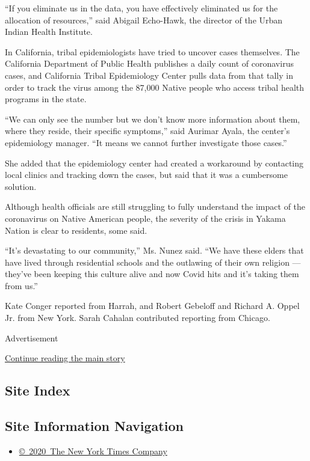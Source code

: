``If you eliminate us in the data, you have effectively eliminated us
for the allocation of resources,'' said Abigail Echo-Hawk, the director
of the Urban Indian Health Institute.

In California, tribal epidemiologists have tried to uncover cases
themselves. The California Department of Public Health publishes a daily
count of coronavirus cases, and California Tribal Epidemiology Center
pulls data from that tally in order to track the virus among the 87,000
Native people who access tribal health programs in the state.

``We can only see the number but we don't know more information about
them, where they reside, their specific symptoms,'' said Aurimar Ayala,
the center's epidemiology manager. ``It means we cannot further
investigate those cases.''

She added that the epidemiology center had created a workaround by
contacting local clinics and tracking down the cases, but said that it
was a cumbersome solution.

Although health officials are still struggling to fully understand the
impact of the coronavirus on Native American people, the severity of the
crisis in Yakama Nation is clear to residents, some said.

``It's devastating to our community,'' Ms. Nunez said. ``We have these
elders that have lived through residential schools and the outlawing of
their own religion --- they've been keeping this culture alive and now
Covid hits and it's taking them from us.''

Kate Conger reported from Harrah, and Robert Gebeloff and Richard A.
Oppel Jr. from New York. Sarah Cahalan contributed reporting from
Chicago.

Advertisement

\protect\hyperlink{after-bottom}{Continue reading the main story}

\hypertarget{site-index}{%
\subsection{Site Index}\label{site-index}}

\hypertarget{site-information-navigation}{%
\subsection{Site Information
Navigation}\label{site-information-navigation}}

\begin{itemize}
\tightlist
\item
  \href{https://help.nytimes3xbfgragh.onion/hc/en-us/articles/115014792127-Copyright-notice}{©~2020~The
  New York Times Company}
\end{itemize}

